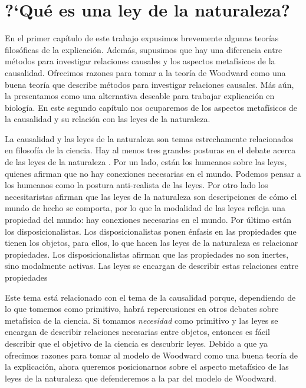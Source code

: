 
\chapter{?`Qué es una ley de la naturaleza?}

\noindent En el primer capítulo de este trabajo expusimos brevemente algunas teorías filosóficas de la explicación. Además, supusimos que hay una diferencia entre métodos para investigar relaciones causales y los aspectos metafísicos de la causalidad. Ofrecimos razones para tomar a la teoría de Woodward como una buena teoría que describe métodos para investigar relaciones causales. Más aún, la presentamos como una alternativa deseable para trabajar explicación en biología. En este segundo capítulo nos ocuparemos de los aspectos metafísicos de la causalidad y su relación con las leyes de la naturaleza.

La causalidad y las leyes de la naturaleza son temas estrechamente relacionados en filosofía de la ciencia. Hay al menos tres grandes posturas en el debate acerca de las leyes de la naturaleza \cite{Borge2019}. Por un lado, están los humeanos sobre las leyes, quienes afirman que no hay conexiones necesarias en el mundo. Podemos pensar a los humeanos como la postura anti-realista de las leyes. Por otro lado los necesitaristas afirman que las leyes de la naturaleza son descripciones de cómo el mundo de hecho se comporta, por lo que la modalidad de las leyes refleja una propiedad del mundo: hay conexiones necesarias en el mundo. Por último están los disposicionalistas. Los disposicionalistas ponen énfasis en las propiedades que tienen los objetos, para ellos, lo que hacen las leyes de la naturaleza es relacionar propiedades. Los disposicionalistas afirman que las propiedades no son inertes, sino modalmente activas. Las leyes se encargan de describir estas relaciones entre propiedades

Este tema está relacionado con el tema de la causalidad porque, dependiendo de lo que tomemos como primitivo, habrá repercusiones en otros debates sobre metafísica de la ciencia. Si tomamos \emph{necesidad} como primitivo y las leyes se encargan de describir relaciones necesarias entre objetos, entonces es fácil describir que el objetivo de la ciencia es descubrir leyes. Debido a que ya ofrecimos razones para tomar al modelo de Woodward como una buena teoría de la explicación, ahora queremos posicionarnos sobre el aspecto metafísico de las leyes de la naturaleza que defenderemos a la par del modelo de Woodward.

